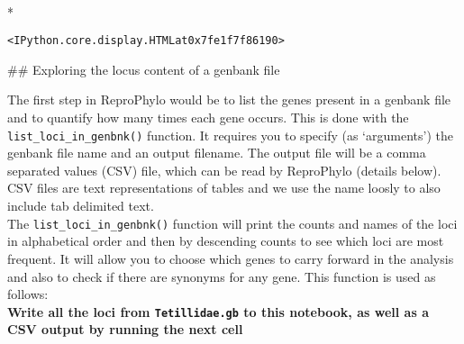 \documentclass[letterpaper,10pt,english]{/usr/share/sphinx/texinputs/sphinxhowto}
\def\smaller{\fontsize{9.5pt}{9.5pt}\selectfont}
\newenvironment{InvisibleVerbatim}
        {\begin{mdframed}[leftmargin=0.1\linewidth,innerleftmargin=3pt,innerrightmargin=3pt, userdefinedwidth=1\linewidth, linewidth=0pt, linecolor=white, usetwoside=false]}
        {\end{mdframed}}
\begin{document}
    

        
        

            
                \makebox[0.1\linewidth]{\smaller\hfill\tt\color{nbframe-out-prompt}Out\hspace{4pt}{[}4{]}:\hspace{4pt}}\\*
                \vspace{-2.55\baselineskip}\begin{InvisibleVerbatim}
                \vspace{-0.5\baselineskip}
\begin{alltt}<IPython.core.display.HTML at 0x7fe1f7f86190>\end{alltt}

            \end{InvisibleVerbatim}
            
        
    
\#\# Exploring the locus content of a genbank file

The first step in ReproPhylo would be to list the genes present in a
genbank file and to quantify how many times each gene occurs. This is
done with the \texttt{list\_loci\_in\_genbnk()} function. It requires
you to specify (as `arguments') the genbank file name and an output
filename. The output file will be a comma separated values (CSV) file,
which can be read by ReproPhylo (details below). CSV files are text
representations of tables and we use the name loosly to also include tab
delimited text.\\The \texttt{list\_loci\_in\_genbnk()} function will
print the counts and names of the loci in alphabetical order and then by
descending counts to see which loci are most frequent. It will allow you
to choose which genes to carry forward in the analysis and also to check
if there are synonyms for any gene. This function is used as follows:\\

\textbf{Write all the loci from \texttt{Tetillidae.gb} to this notebook,
as well as a CSV output by running the next cell}

\end{document}

